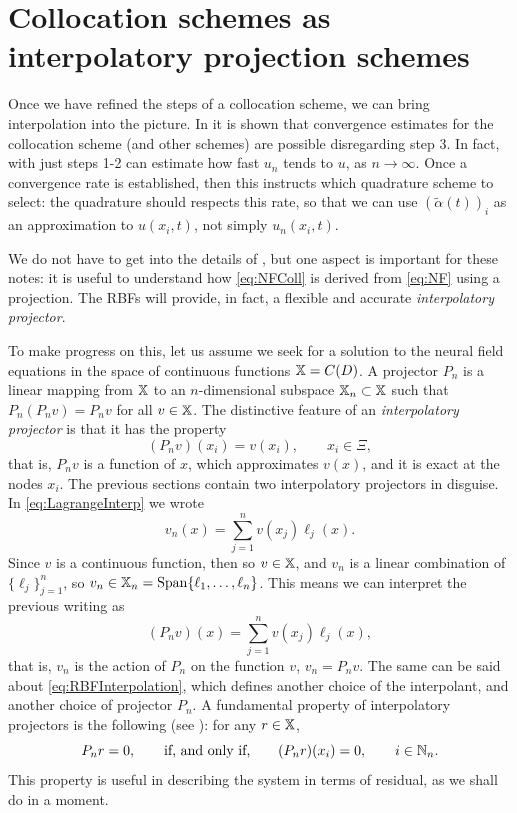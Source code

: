 \documentclass[a4paper]{siamart190516}
\begin{document}
\section{Collocation schemes as interpolatory projection schemes}\label{sec:projectionSchemes} 

Once we have refined the steps of a collocation scheme, we can bring interpolation
into the picture. In \cite{Avitabile:2023ab} it is shown that convergence estimates
for the collocation scheme (and other schemes) are possible disregarding step 3. In
fact, with just steps 1-2 can estimate how fast $u_n$ tends to $u$, as $n \to \infty$.
Once a convergence rate is established, then this instructs which quadrature scheme
to select: the quadrature should respects this rate, so that we can use $(\tilde
\alpha(t))_i$ as an approximation to $u(x_i,t)$, not simply $u_n(x_i,t)$. 

We do not have to get into the details of
\cite{Avitabile:2023ab}, but one aspect is important for these
notes: it is useful to understand how \cref{eq:NFColl} is derived from \cref{eq:NF}
using a projection. The RBFs will provide, in fact, a flexible and accurate
\textit{interpolatory projector}. 

To make progress on this, let us assume we seek for a solution to the neural field
equations in the space of continuous functions $\mathbb{X} = C(D)$. A projector $P_n$ is a
linear mapping from $\mathbb{X}$ to an $n$-dimensional subspace $\mathbb{X}_n \subset \mathbb{X}$
such that $P_n (P_n v) = P_n v$ for all $v \in \mathbb{X}$. The distinctive feature of an
\textit{interpolatory projector} is that it has the property  
\[
  (P_n v)(x_i) = v(x_i), \qquad x_i \in \Xi,
\] 
that is, $P_n v$ is a function of $x$, which approximates $v(x)$, and it is exact
at the nodes $x_i$. The previous sections contain two interpolatory projectors in
disguise. In \cref{eq:LagrangeInterp} we wrote
\[
  v_n(x) = \sum_{j=1}^{n} v(x_j) \ell_j(x). 
\]
Since $v$ is a continuous function, then so $v \in \mathbb{X}$, and $v_n$ is a linear combination
of $\{ \ell_j \}_{j=1}^n$, so $v_n \in \mathbb{X}_n = \operatorname{Span} \{ \ell_1, \ldots, \ell_n \}$.
This means we can interpret the previous writing as
\[
  (P_n v)(x) = \sum_{j=1}^{n} v(x_j) \ell_j(x),
\]
that is, $v_n$ is the action of $P_n$ on the function $v$, $v_n = P_n v$.
The same can be said about \cref{eq:RBFInterpolation}, which defines another choice
of the interpolant, and another choice of projector $P_n$. A fundamental property of
interpolatory projectors is the following (see \cite[Proposition
4.1]{Avitabile:2023ab}):  for any
$r \in \mathbb{X}$, 
\begin{equation}\label{eq:projCollProperty}
P_n r = 0, 
\qquad \text{if, and only if,} \qquad 
(P_n r)(x_i) = 0, \qquad i \in \NSet_n.
\end{equation}
This property is useful in describing the system in terms of residual, as we shall do
in a moment.
\end{document}
